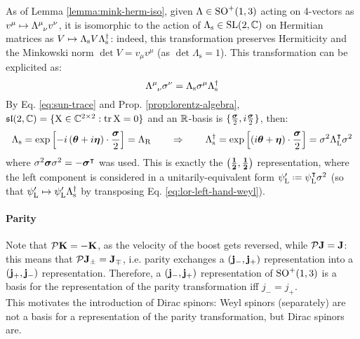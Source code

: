 As of Lemma \ref{lemma:mink-herm-iso}, given $ \Lambda \in \mathrm{SO}^+(1,3) $ acting on 4-vectors as $ v^\mu \mapsto \tensor{\Lambda}{^\mu _\nu} v^\nu $, it is isomorphic to the action of $ \Lambda_\text{s} \in \mathrm{SL}(2,\mathbb{C}) $ on Hermitian matrices as $ V \mapsto \Lambda_\text{s} V \mathrm{\Lambda}_\text{s}^\dagger $: indeed, this transformation preserves Hermiticity and the Minkowski norm $ \det V = v_\mu v^\mu $ (as $ \det \Lambda_\text{s} = 1 $). This transformation can be explicited as:
\begin{equation}
  \tensor{\Lambda}{^\mu_\nu} \sigma^\nu = \Lambda_\text{s} \sigma^\mu \Lambda_\text{s}\dg
\end{equation}
By Eq. \ref{eq:sun-trace} and Prop. \ref{prop:lorentz-algebra}, $ \mathfrak{sl}(2,\mathbb{C}) = \{\mathrm{X} \in \mathbb{C}^{2 \times 2} : \operatorname{tr} \mathrm{X} = 0\} $ and an $ \mathbb{R} $-basis is $ \{\frac{\boldsymbol{\sigma}}{2},i\frac{\boldsymbol{\sigma}}{2}\} $, then:
\begin{equation*}
  \Lambda_\text{s} = \exp \left[ -i \left( \boldsymbol{\theta} + i \boldsymbol{\eta} \right) \cdot \frac{\boldsymbol{\sigma}}{2} \right] = \Lambda_\text{R}
  \qquad
  \Rightarrow
  \qquad
  \Lambda_\text{s}^\dagger = \exp \left[ \left( i \boldsymbol{\theta} + \boldsymbol{\eta} \right) \cdot \frac{\boldsymbol{\sigma}}{2} \right] = \sigma^2 \Lambda_\text{L}^\intercal \sigma^2
\end{equation*}
where $ \sigma^2 \boldsymbol{\sigma} \sigma^2 = - \boldsymbol{\sigma}^\intercal $ was used. This is exactly the $ \mathbf{\left( \frac{1}{2},\frac{1}{2} \right)} $ representation, where the left component is considered in a unitarily-equivalent form $ \psi_\text{L}' \defeq \psi_\text{L}^\intercal \sigma^2 $ (so that $ \psi_\text{L}' \mapsto \psi_\text{L}' \Lambda_\text{s}^\dagger $ by transposing Eq. \ref{eq:lor-left-hand-weyl}).

\paragraph{Parity}

Note that $ \mathcal{P} \mathbf{K} = -\mathbf{K} $, as the velocity of the boost gets reversed, while $ \mathcal{P} \mathbf{J} = \mathbf{J} $: this means that $ \mathcal{P} \mathbf{J}_\pm = \mathbf{J}_\mp $, i.e. parity exchanges a $ \mathbf{\left( j_-,j_+ \right)} $ representation into a $ \mathbf{\left( j_+,j_- \right)} $ representation. Therefore, a $ \mathbf{\left( j_-,j_+ \right)} $ representation of $ \mathrm{SO}^+(1,3) $ is a basis for the representation of the parity transformation iff $ j_- = j_+ $.\\
This motivates the introduction of Dirac spinors: Weyl spinors (separately) are not a basis for a representation of the parity transformation, but Dirac spinors are.

